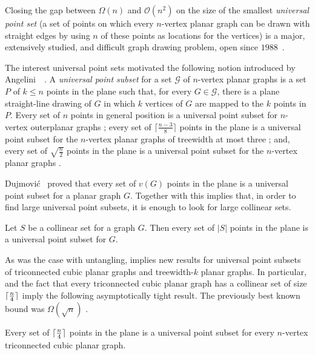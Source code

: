 Closing the gap between $\Omega(n)$ and $\mathcal{O}(n^2)$ on the size of the
smallest \emph{universal point set} (a set of points on which
every $n$-vertex planar graph can be drawn with straight edges by using $n$ of these
points as locations for the vertices) is a major, extensively studied, and difficult graph
drawing problem, open since
$1988$~\cite{%
  dFPP90, DBLP:journals/ipl/Kurowski04, DBLP:journals/jgaa/BannisterCDE14}. 
  
The interest universal point sets motivated the following notion introduced by Angelini~\etal~\cite{abehlmmo-ups-12}. 
A \emph{universal point subset} for  a set $\mathcal{G}$ of $n$-vertex planar graphs is a
set $P$ of $k\leq n$ points in the plane such that, for every
$G\in\mathcal{G}$, there is a plane straight-line
drawing of $G$ in which $k$ vertices of $G$ are mapped to the $k$
points in $P$. Every set of $n$ points in general position is a
universal point subset for $n$-vertex outerplanar graphs
\cite{GMPP,DBLP:journals/comgeo/Bose02,DBLP:conf/cccg/CastanedaU96};  every
set of $\lceil \frac{n-3}{8}\rceil$ points in the plane is a universal
point subset for the $n$-vertex planar graphs of treewidth at most
three \cite{dalozzo.dujmovic.ea:drawing}; and, every set of $\sqrt{\frac{n}{2}}$ points in the plane is a universal point
subset for the $n$-vertex planar graphs \cite{dujmovic:utility}. 

Dujmovi\'c~\cite{dujmovic:utility}
  proved that every set of $v(G)$ points in the plane is a universal point subset
  for a planar graph $G$. Together with  this implies
  that, in order to find large universal point subsets, it is enough to look for large collinear sets.

\begin{thm}
Let $S$ be a collinear set for a graph $G$. Then every set of $|S|$ points in the
plane is a universal point subset for $G$.
\end{thm}

As was the case with untangling,  implies new results
for universal point subsets of triconnected cubic planar graphs and
treewidth-$k$ planar graphs. In particular,  and the
fact that every triconnected cubic planar graph has a collinear set of
size ${\lceil \frac{n}{4} \rceil}$ \cite{dalozzo.dujmovic.ea:drawing} imply the
following asymptotically tight result. The previously best known bound
was $\Omega(\sqrt{n})$ \cite{dujmovic:utility}.

\begin{cor}
Every set of ${\lceil \frac{n}{4} \rceil}$ points in the plane  is a universal
point subset for  every $n$-vertex triconnected cubic
planar graph.
\end{cor}

